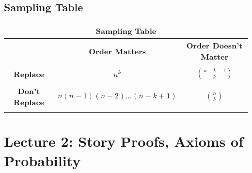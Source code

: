 \documentclass[11pt, oneside]{article}   	%
\begin{document}
	\subsection{Sampling Table}
	\begin{center}
		\begin{tabular}{ |c|c|c| }
	 	\hline
		\multicolumn{3}{|c|}{ \textbf{Sampling Table} } \\
 		\hline
 		&\textbf{Order Matters}	&\textbf{Order Doesn't Matter} \\
 		\hline
 		&&\\
		\textbf{Replace}	&$n^k$ 	&$\binom{n+k-1}{k}$\\
		&&\\
		\textbf{Don't Replace} 	&$n(n-1)(n-2)...(n-k+1)$ 	& $\binom{n}{k}$\\
		&&\\
 		\hline
		\end{tabular}
	\end{center}
	
\break
\section{Lecture 2: Story Proofs, Axioms of Probability}
\end{document}
